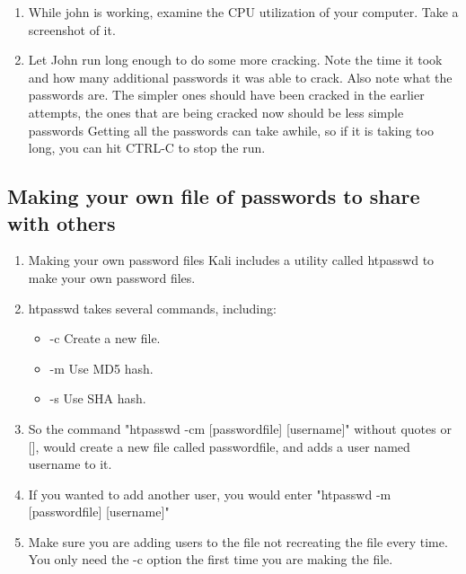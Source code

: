 \documentclass[12pt]{article}
\begin{document}
\begin{enumerate}
        john crack-these-please
        \item While john is working, examine the CPU utilization of your computer. Take a screenshot of it.
        \item Let John run long enough to do some more cracking. Note the time it took and how many additional passwords it was able to crack. Also note what the passwords are. The simpler ones should have been cracked in the earlier attempts, the ones that are being cracked now should be less simple passwords
        Getting all the passwords can take awhile, so if it is taking too long, you can hit CTRL-C to stop the run.
    \end{enumerate}
\subsection*{Making your own file of passwords to share with others}
\begin{enumerate}
    \item Making your own password files
    Kali includes a utility called htpasswd to make your own password files.
    \item htpasswd  takes several commands, including:
        \begin{itemize}
            \item -c    Create a new file.
            \item -m    Use MD5 hash.
            \item -s    Use SHA hash. 
        \end{itemize}
    \item So the command
    "htpasswd -cm [passwordfile] [username]" without quotes or [], would create a new file called passwordfile, and adds a user named username to it.
    \item If you wanted to add another user, you would enter
    "htpasswd -m [passwordfile] [username]" 
    \item Make sure you are adding users to the file not recreating the file every time.  You only need the -c option the first time you are making the file. 
    



\end{enumerate}
\end{document}
